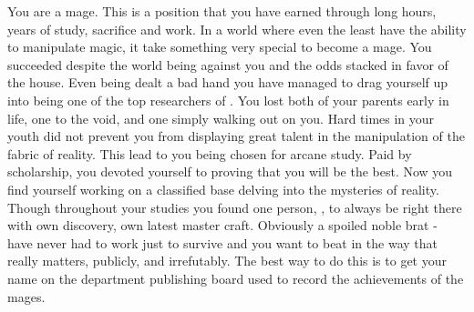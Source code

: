 \documentclass[char]{guildcamp3}
\begin{document}
\name{\cMageTwo{}}

\updatemacro{\cNPC}{
  \unknownplayer %
  }



You are a mage. This is a position that you have earned through long hours, years of study, sacrifice and work. In a world where even the least have the ability to manipulate magic, it take something very special to become a mage. You succeeded despite the world being against you and the odds stacked in favor of the house. Even being dealt a bad hand you have managed to drag yourself up into being one of the top researchers of \bMagicWorld{}. You lost both of your parents early in life, one to the void, and one simply walking out on you. Hard times in your youth did not prevent you from displaying great talent in the manipulation of the fabric of reality. This lead to you being chosen for arcane study. Paid by scholarship, you devoted yourself to proving that you will be the best. Now you find yourself working on a classified base delving into the mysteries of reality. Though throughout your studies you found one person, \cMageOne{\intro}, to always be right there with \cMageOne{\their} own discovery, \cMageOne{\their} own latest master craft. Obviously a spoiled noble brat -  have never had to work just to survive and you want to beat \cMageOne{\them} in the way that really matters, publicly, and irrefutably. The best way to do this is to get your name on the department publishing board used to record the achievements of the mages.
\end{document}
